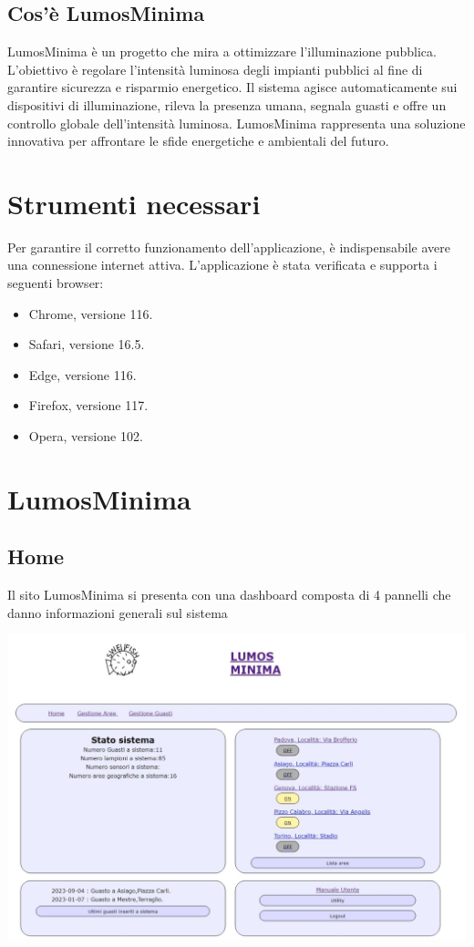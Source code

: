 \documentclass[9pt]{article}
\begin{document}
\subsection{Cos'è LumosMinima}
LumosMinima è un progetto che mira a ottimizzare l'illuminazione pubblica. L'obiettivo è regolare l'intensità luminosa degli impianti pubblici al fine di garantire sicurezza e risparmio energetico. Il sistema agisce automaticamente sui dispositivi di illuminazione, rileva la presenza umana, segnala guasti e offre un controllo globale dell'intensità luminosa. LumosMinima rappresenta una soluzione innovativa per affrontare le sfide energetiche e ambientali del futuro.

\section{Strumenti necessari}
Per garantire il corretto funzionamento dell'applicazione, è indispensabile avere una connessione internet attiva. L'applicazione è stata verificata e supporta i seguenti browser:

\begin{itemize}
	\item Chrome, versione 116.
	\item Safari, versione 16.5.
	\item Edge, versione 116.
	\item Firefox, versione 117.
	\item Opera, versione 102.
\end{itemize}

\section{LumosMinima}
\subsection{Home}
Il sito LumosMinima si presenta con una dashboard composta di 4 pannelli che danno informazioni generali
sul sistema

\begin{center}
	\includegraphics[scale=0.3]{LumosMinimaHome.png}
\end{center}
\end{document}
